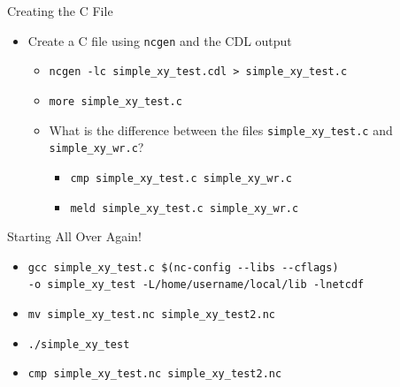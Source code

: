 \documentclass[compress,11pt,xcolor=svgnames,aspectratio=169]{beamer}
\begin{document}
\begin{frame}[fragile]{Creating the C File}

\begin{itemize}
\setlength\itemsep{0.4cm}

  \item Create a C file using \texttt{ncgen} and the CDL output\\[0.4cm]

  \begin{itemize}
  \setlength\itemsep{0.5cm}

    \item \verb|ncgen -lc simple_xy_test.cdl > simple_xy_test.c|
    \item \verb|more simple_xy_test.c|
    \item What is the difference between the files \verb|simple_xy_test.c| and \verb|simple_xy_wr.c|?

    \begin{itemize}
      \item \verb|cmp simple_xy_test.c simple_xy_wr.c|
      \item \verb|meld simple_xy_test.c simple_xy_wr.c|
    \end{itemize}

  \end{itemize}

\end{itemize}

\end{frame}

\begin{frame}[fragile]{Starting All Over Again!}

\begin{itemize}
  \setlength\itemsep{0.5cm}

  \item \verb|gcc simple_xy_test.c $(nc-config --libs --cflags)|\\
  \verb|-o simple_xy_test -L/home/username/local/lib -lnetcdf|
  \item \verb|mv simple_xy_test.nc simple_xy_test2.nc|
  \item \verb|./simple_xy_test|
  \item \verb|cmp simple_xy_test.nc simple_xy_test2.nc|

\end{itemize}

\end{frame}
\end{document}
